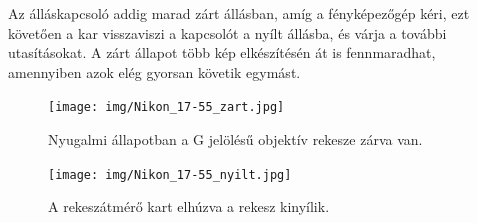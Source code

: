 Az álláskapcsoló addig marad zárt állásban, amíg a fényképezőgép kéri, ezt követően a kar visszaviszi a kapcsolót a nyílt állásba, és várja a további utasításokat.
A zárt állapot több kép elkészítésén át is fennmaradhat, amennyiben azok elég gyorsan követik egymást.

\begin{figure}[H]
	\centering
	\texttt{[image: img/Nikon\_17-55\_zart.jpg]}
	\caption{Nyugalmi állapotban a G jelölésű objektív rekesze zárva van.}
	\label{fig:17-55_zart}
\end{figure}

\begin{figure}[H]
	\centering
	\texttt{[image: img/Nikon\_17-55\_nyilt.jpg]}
	\caption{A rekeszátmérő kart elhúzva a rekesz kinyílik.}
	\label{fig:17-55_nyilt}
\end{figure}

